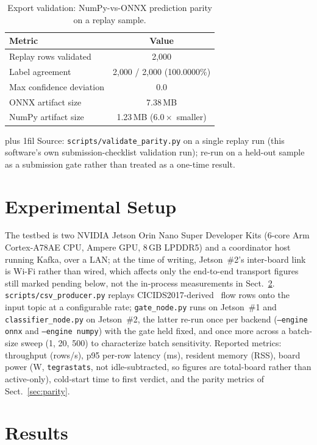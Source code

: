 \documentclass[runningheads]{llncs}
\newcommand{\tabnote}[1]{%
  \vspace{4pt}\par\noindent
  \begin{minipage}{\textwidth}%
    \footnotesize\parindent=0pt\leftskip=0pt\rightskip=0pt\parfillskip=0pt plus 1fil\relax
    #1%
  \end{minipage}}
\begin{document}
\begin{table}[htbp]
  \caption{Export validation: NumPy-vs-ONNX prediction parity on a replay sample.}
  \label{tab:parity}
  \centering
  \small
  \begin{tabular}{l c}
    \toprule
    Metric & Value \\
    \midrule
    Replay rows validated & 2{,}000 \\
    Label agreement & 2{,}000 / 2{,}000 (100.0000\%) \\
    Max confidence deviation & 0.0 \\
    ONNX artifact size & 7.38\,MB \\
    NumPy artifact size & 1.23\,MB ($6.0\times$ smaller) \\
    \bottomrule
  \end{tabular}
  \tabnote{Source: \texttt{scripts/validate\_parity.py} on a single replay run (this software's own submission-checklist validation run); re-run on a held-out sample as a submission gate rather than treated as a one-time result.}
\end{table}

\section{Experimental Setup}

The testbed is two NVIDIA Jetson Orin Nano Super Developer Kits (6-core Arm Cortex-A78AE CPU, Ampere GPU, 8\,GB LPDDR5) and a coordinator host running Kafka, over a LAN; at the time of writing, Jetson~\#2's inter-board link is Wi-Fi rather than wired, which affects only the end-to-end transport figures still marked pending below, not the in-process measurements in Sect.~\ref{sec:results}. \texttt{scripts/csv\_producer.py} replays CICIDS2017-derived~\cite{sharafaldin2018toward} flow rows onto the input topic at a configurable rate; \texttt{gate\_node.py} runs on Jetson~\#1 and \texttt{classifier\_node.py} on Jetson~\#2, the latter re-run once per backend (\texttt{--engine onnx} and \texttt{--engine numpy}) with the gate held fixed, and once more across a batch-size sweep (1, 20, 500) to characterize batch sensitivity. Reported metrics: throughput (rows/s), p95 per-row latency (ms), resident memory (RSS), board power (W, \texttt{tegrastats}, not idle-subtracted, so figures are total-board rather than active-only), cold-start time to first verdict, and the parity metrics of Sect.~\ref{sec:parity}.

\section{Results}
\label{sec:results}
\end{document}
